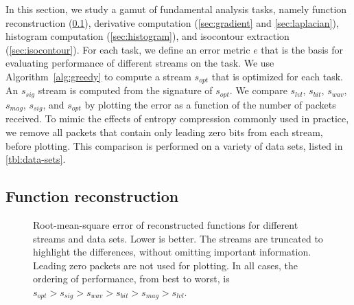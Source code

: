 In this section, we study a gamut of fundamental analysis tasks, namely function reconstruction
(\cref{sec:rmse-optimized}), derivative computation (\cref{sec:gradient} and
\cref{sec:laplacian}), histogram computation (\cref{sec:histogram}), and isocontour extraction
(\cref{sec:isocontour}). For each task, we define an error metric $e$ that is the basis for
evaluating performance of different streams on the task. We use Algorithm~\ref{alg:greedy} to
compute a stream $s_{opt}$ that is optimized for each task. An $s_{sig}$ stream is computed from the
signature of $s_{opt}$. We compare $s_{lvl}$, $s_{bit}$, $s_{wav}$, $s_{mag}$, $s_{sig}$, and
$s_{opt}$ by plotting the error as a function of the number of packets received. To mimic the
effects of entropy compression commonly used in practice, we remove all packets that contain only
leading zero bits from each stream, before plotting. This comparison is performed on a variety of
data sets, listed in \cref{tbl:data-sets}. 

\subsection{Function reconstruction}\label{sec:rmse-optimized}

\begin{figure}[t]
  \centering
		\caption{Root-mean-square error of reconstructed functions for different streams and data sets.
		Lower is better. The streams are truncated to highlight the differences, without omitting
		important information. Leading zero packets are not used for plotting. In all cases, the
		ordering of performance, from best to worst, is $s_{opt} > s_{sig} > s_{wav} > s_{bit} > s_{mag}
		> s_{lvl}$.}\label{fig:rmse-optimized}
\end{figure}

